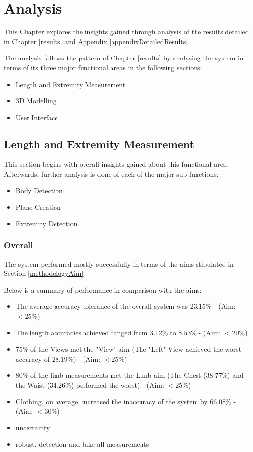 \chapter{Analysis} \label{analysis}

This Chapter explores the insights gained through analysis of the results detailed in Chapter \ref{results} and Appendix \ref{appendixDetailedResults}.

The analysis follows the pattern of Chapter \ref{results} by analysing the system in terms of its three major functional areas in the following sections:

\begin{itemize}
	\item Length and Extremity Measurement
	\item 3D Modelling
	\item User Interface
\end{itemize} 

\section{Length and Extremity Measurement}
This section begins with overall insights gained about this functional area. Afterwards, further analysis is done of each of the major sub-functions:

\begin{itemize}
	\item Body Detection
	\item Plane Creation
	\item Extremity Detection
\end{itemize}

\subsection{Overall}
The system performed mostly successfully in terms of the aims stipulated in Section \ref{methodologyAim}. 

Below is a summary of performance in comparison with the aims:

\begin{itemize}
	\item The average accuracy tolerance of the overall system was 23.15\% - (Aim: $<25\%$)
	\item The length accuracies achieved ranged from 3.12\% to 8.53\% - (Aim: $<20\%$)
	\item 75\% of the Views met the "View" aim (The "Left" View achieved the worst accuracy of 28.19\%) - (Aim: $<25\%$)
	\item 80\% of the limb measurements met the Limb aim (The Chest (38.77\%) and the Waist (34.26\%) performed the worst) - (Aim: $<25\%$)
	\item Clothing, on average, increased the inaccuracy of the system by 66.08\% - (Aim: $<30\%$)
	\item uncertainty
	\item robust, detection and take all measurements
\end{itemize}

